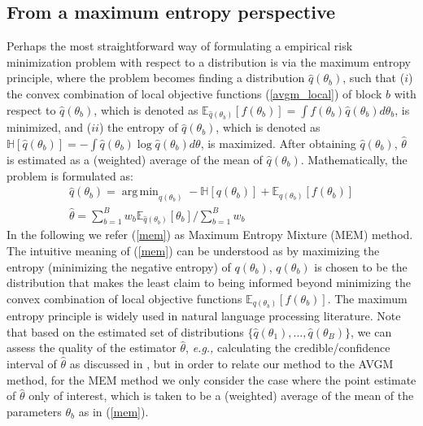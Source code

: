 \documentclass{article}
\DeclareMathOperator*{\argmin}{arg\,min}
\newcommand{\eg}[0]{\emph{e.g., }}
\newcommand{\1}[0]{\ensuremath{\boldsymbol{1}}\xspace}
\begin{document}
\subsection{From a maximum entropy perspective}\label{MEM}
Perhaps the most straightforward way of formulating a empirical risk minimization problem with respect to a distribution is via the maximum entropy principle, where the problem becomes finding a distribution $\hat q(\theta_b)$, such that ($i$) the convex combination of local objective functions (\ref{avgm_local}) of block $b$ with respect to $\hat q(\theta_b)$, which is denoted as $\mathbb{E}_{\hat q(\theta_b)}[f(\theta_b)] = \int f(\theta_b)\hat q(\theta_b) d\theta_b$, is minimized, and ($ii$) the entropy of $\hat q(\theta_b)$, which is denoted as $\mathbb{H}[\hat q(\theta_b)] = -\int \hat q(\theta_b)\log  \hat q(\theta_b) d\theta$, is maximized. After obtaining $\hat q(\theta_b)$, $\hat\theta$ is estimated as a (weighted) average of the mean of $\hat q(\theta_b)$. Mathematically, the problem is formulated as:
\begin{equation}\label{mem}
\begin{gathered}
\textstyle\hat q(\theta_b) =\argmin_{q(\theta_b)} -\mathbb{H}[q(\theta_b)] +  \mathbb{E}_{q(\theta_b) }[f(\theta_b)]\\
\hat\theta = \textstyle\sum_{b=1}^Bw_b\mathbb{E}_{\hat q(\theta_b) }[\theta_b]/\sum_{b=1}^Bw_b
\end{gathered}
\end{equation}
In the following we refer (\ref{mem}) as Maximum Entropy Mixture (MEM) method. The intuitive meaning of (\ref{mem}) can be understood as by maximizing the entropy (minimizing the negative entropy) of $q(\theta_b)$, $q(\theta_b)$ is chosen to be the distribution that makes the least claim to being informed beyond minimizing the convex combination of local objective functions $\mathbb{E}_{q(\theta_b) }[f(\theta_b)]$. The maximum entropy principle is widely used in natural language processing literature. Note that based on the estimated set of distributions $\{\hat q(\theta_1), \ldots, \hat q(\theta_B)\}$, we can assess the quality of the estimator $\hat\theta$, \eg calculating the credible/confidence interval of $\hat\theta$ as discussed in \cite{Kleiner2012}, but in order to relate our method to the AVGM method, for the MEM method we only consider the case where the point estimate of $\hat\theta$ only of interest, which is taken to be a (weighted) average of the mean of the parameters $\theta_b$ as in (\ref{mem}).
\end{document}
